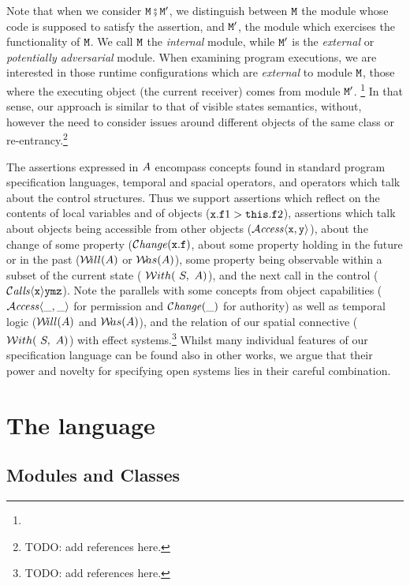 Note that when we consider ${\mbox{\tt{\ensuremath{{\mbox{\tt{M}}}}}}} \fatsemi  {{\mbox{\tt{\ensuremath{{\mbox{\tt{M}}}}}}}'}$, we distinguish between ${\mbox{\tt{\ensuremath{{\mbox{\tt{M}}}}}}}$ the module
whose code  is supposed to satisfy the assertion, and ${\mbox{\tt{\ensuremath{{\mbox{\tt{M}}}}}}}'$, the module which exercises
the functionality of ${\mbox{\tt{\ensuremath{{\mbox{\tt{M}}}}}}}$. We call ${\mbox{\tt{\ensuremath{{\mbox{\tt{M}}}}}}}$ the {\em internal} module, while ${\mbox{\tt{\ensuremath{{\mbox{\tt{M}}}}}}}'$ is the {\em external}
or {\em potentially adversarial} module. When examining program executions, we are interested
 in those runtime configurations which are {\em external} to module ${\mbox{\tt{\ensuremath{{\mbox{\tt{M}}}}}}}$, \ie those where the
 executing object (\ie the current receiver) comes from module ${\mbox{\tt{\ensuremath{{\mbox{\tt{M}}}}}}}'$.
 \footnote{}
 In  that sense, our approach is similar to that of visible states semantics, without, however the need to consider issues
around different objects of the same class or re-entrancy.\footnote{TODO: add references here.}

The assertions expressed in $A$  encompass concepts found in
 standard program specification languages, temporal and spacial operators, and operators which talk about the control structures.
Thus we support assertions which reflect on the contents of local variables
 and of objects  (\eg ${\mbox{\tt{x}}}.{\mbox{\tt{f}}}1 > {\mbox{\tt{this}}}.{\mbox{\tt{f}}}2$), assertions which talk about objects being accessible from other objects
(\eg ${\mathcal{A}}\textrm{\textit{ccess}}\langle {\mbox{\tt{x}}},{\mbox{\tt{y}}}\rangle$), about the change of some property
(\eg $\mathcal{C}\textrm{\textit{hange}}({\mbox{\tt{x}}}.{\mbox{\tt{f}}})$, about some property   holding in the future   or in the past
(\eg ${{\mathcal W}\!ill}(A)$  or ${{\mathcal W}\!as}(A)$), some property being observable within a subset of the current state
( ${\mathcal W}ith(\ S,\ A)$), and the next call in the control (${\mathcal{C}}\textrm{\textit{alls}}\langle {\mbox{\tt{x}}}\rangle {{\mbox{\tt{y}}}} {{\mbox{\tt{m}}}} {{{\mbox{\tt{z}}}}}$). Note the parallels with
some concepts from object capabilities (${\mathcal{A}}\textrm{\textit{ccess}}\langle \_,\_\rangle$  for  permission and $\mathcal{C}\textrm{\textit{hange}}(\_)$ for authority)
as well as temporal logic (${{\mathcal W}\!ill}(A)$  and ${{\mathcal W}\!as}(A)$), and the relation of
our spatial connective (${\mathcal W}ith(\ S,\ A)$)  with effect systems.\footnote{TODO: add references here.}  Whilst
many  individual
features of our specification language can  be found also in other works, we
argue that their power and novelty for specifying open systems lies in their careful
  combination.



\section{The language \LangOO}
\label{sect:LangOO}

\subsection{Modules and Classes}
\label{secONE}

